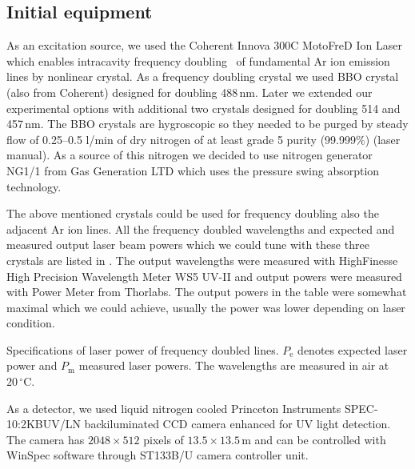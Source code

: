 \subsection{Initial equipment}

As an excitation source, we used the Coherent Innova 300C
MotoFreD\texttrademark{} Ion Laser which enables intracavity frequency
doubling~\parencite{Asher1993b} of fundamental Ar ion emission lines by
nonlinear crystal. As a frequency doubling crystal we used BBO crystal (also
from Coherent) designed for doubling 488\,nm. Later we extended our
experimental options with additional two crystals designed for doubling 514 and
457\,nm. The BBO crystals are hygroscopic so they needed to be purged by steady
flow of 0.25--0.5 l/min of dry nitrogen of at least grade 5 purity (99.999\%)
\CITATION(laser manual). As a source of this nitrogen we decided to use
nitrogen generator NG1/1 from Gas Generation LTD which uses the pressure
swing absorption technology.

The above mentioned crystals could be used for
frequency doubling also the adjacent Ar ion lines. All the frequency doubled
wavelengths and expected and measured output laser beam powers which we could
tune with these three crystals are listed in
. The output wavelengths were
measured with HighFinesse High Precision Wavelength Meter WS5 UV-II and output
powers were measured with Power Meter from Thorlabs. The output powers in the
table were somewhat maximal which we could achieve, usually the power was
lower depending on laser condition.

\begin{table}
	\centering
	
	\caption{Specifications of laser power of frequency doubled lines.
	$P_\text{e}$ denotes expected laser power and $P_\text{m}$ measured
	laser powers. The wavelengths are measured in air at $20\,^\circ$C.}
	\label{\tablabel{initial_equipment:laser_power_spec}}
\end{table}

As a detector, we used liquid nitrogen cooled Princeton Instruments
SPEC-10:2KBUV/LN backiluminated CCD camera enhanced for UV light detection.
The camera has $2048\times512$ pixels of $13.5\times13.5$\,m and can
be controlled with WinSpec software through ST133B/U camera controller unit.

